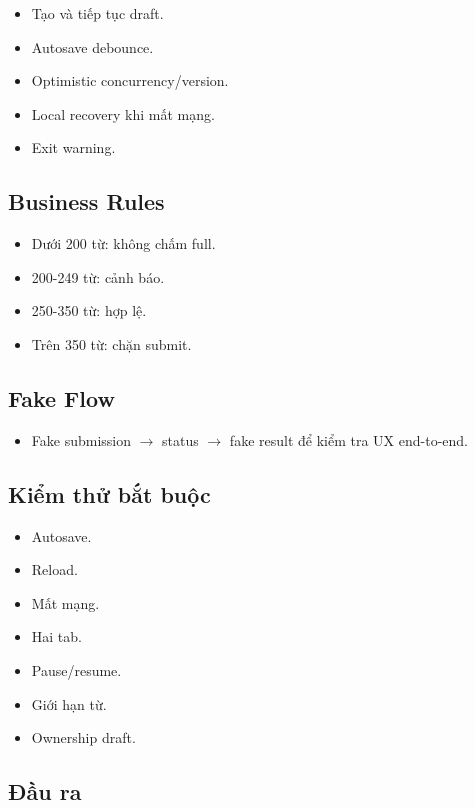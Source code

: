 \documentclass[
  11pt,
  a4paper,
]{article}
\begin{document}
\begin{itemize}
\item
  Tạo và tiếp tục draft.
\item
  Autosave debounce.
\item
  Optimistic concurrency/version.
\item
  Local recovery khi mất mạng.
\item
  Exit warning.
\end{itemize}

\subsection{Business Rules}\label{business-rules}

\begin{itemize}
\item
  Dưới 200 từ: không chấm full.
\item
  200-249 từ: cảnh báo.
\item
  250-350 từ: hợp lệ.
\item
  Trên 350 từ: chặn submit.
\end{itemize}

\subsection{Fake Flow}\label{fake-flow}

\begin{itemize}
\item
  Fake submission \(\rightarrow\) status \(\rightarrow\) fake result để kiểm tra UX end-to-end.
\end{itemize}

\subsection{Kiểm thử bắt
buộc}\label{kiux1ec3m-thux1eed-bux1eaft-buux1ed9c-2}

\begin{itemize}
\item
  Autosave.
\item
  Reload.
\item
  Mất mạng.
\item
  Hai tab.
\item
  Pause/resume.
\item
  Giới hạn từ.
\item
  Ownership draft.
\end{itemize}

\subsection{Đầu ra}\label{ux111ux1ea7u-ra-4}
\end{document}
